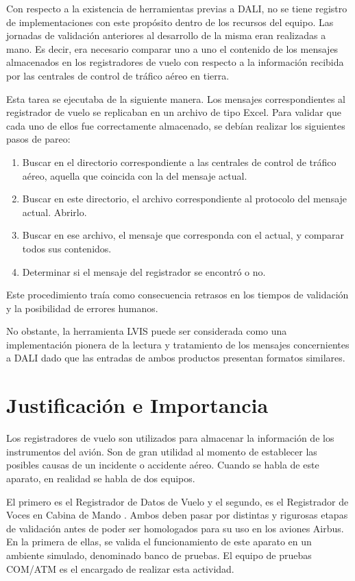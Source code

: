 Con respecto a la existencia de herramientas previas a DALI, no se tiene registro de implementaciones con este propósito dentro de los recursos del equipo. Las jornadas de validación anteriores al desarrollo de la misma eran realizadas a mano. Es decir, era necesario comparar uno a uno el contenido de los mensajes almacenados en los registradores de vuelo con respecto a la información recibida por las centrales de control de tráfico aéreo en tierra. 

Esta tarea se ejecutaba de la siguiente manera. Los mensajes correspondientes al registrador de vuelo se replicaban en un archivo de tipo Excel. Para validar que cada uno de ellos fue correctamente almacenado, se debían realizar los siguientes pasos de pareo:

\begin{enumerate}
\item Buscar en el directorio correspondiente a las centrales de control de tráfico aéreo, aquella que coincida con la del mensaje actual.
\item Buscar en este directorio, el archivo correspondiente al protocolo del mensaje actual. Abrirlo.
\item Buscar en ese archivo, el mensaje que corresponda con el actual, y comparar todos sus contenidos.
\item Determinar si el mensaje del registrador se encontró o no.
\end{enumerate}

Este procedimiento traía como consecuencia retrasos en los tiempos de validación y la posibilidad de errores humanos.

No obstante, la herramienta LVIS puede ser considerada como una implementación pionera de la lectura y tratamiento de los mensajes concernientes a DALI dado que las entradas de ambos productos presentan formatos similares. 

\section*{Justificación e Importancia}

Los registradores de vuelo son utilizados para almacenar la información de los instrumentos del avión. Son de gran utilidad al momento de establecer las posibles causas de un incidente o accidente aéreo. Cuando se habla de este aparato, en realidad se habla de dos equipos.

El primero es el Registrador de Datos de Vuelo y el segundo, es el Registrador de Voces en Cabina de Mando \cite{INTRO-REGISTRADOR-VUELO}. Ambos deben pasar por distintas y rigurosas etapas de validación antes de poder ser homologados para su uso en los aviones Airbus. 
En la primera de ellas, se valida el funcionamiento de este aparato en un ambiente simulado, denominado banco de pruebas. El equipo de pruebas COM/ATM es el encargado de realizar esta actividad.

